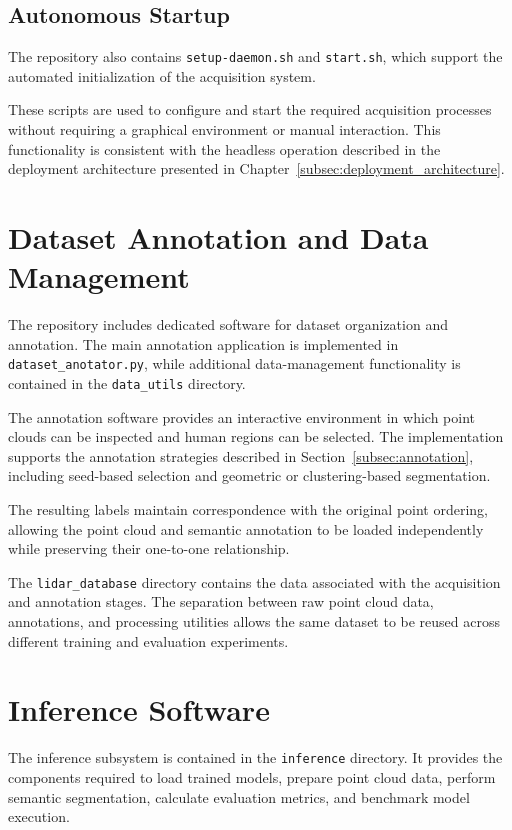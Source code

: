 \subsection{Autonomous Startup}

The repository also contains \texttt{setup-daemon.sh} and \texttt{start.sh}, which support the automated initialization of the acquisition system.

These scripts are used to configure and start the required acquisition processes without requiring a graphical environment or manual interaction. This functionality is consistent with the headless operation described in the deployment architecture presented in Chapter~\ref{subsec:deployment_architecture}.

\section{Dataset Annotation and Data Management}
\label{sec:software_dataset}

The repository includes dedicated software for dataset organization and annotation. The main annotation application is implemented in \texttt{dataset\_anotator.py}, while additional data-management functionality is contained in the \texttt{data\_utils} directory.

The annotation software provides an interactive environment in which point clouds can be inspected and human regions can be selected. The implementation supports the annotation strategies described in Section~\ref{subsec:annotation}, including seed-based selection and geometric or clustering-based segmentation.

The resulting labels maintain correspondence with the original point ordering, allowing the point cloud and semantic annotation to be loaded independently while preserving their one-to-one relationship.

The \texttt{lidar\_database} directory contains the data associated with the acquisition and annotation stages. The separation between raw point cloud data, annotations, and processing utilities allows the same dataset to be reused across different training and evaluation experiments.

\section{Inference Software}
\label{sec:software_inference}

The inference subsystem is contained in the \texttt{inference} directory. It provides the components required to load trained models, prepare point cloud data, perform semantic segmentation, calculate evaluation metrics, and benchmark model execution.

